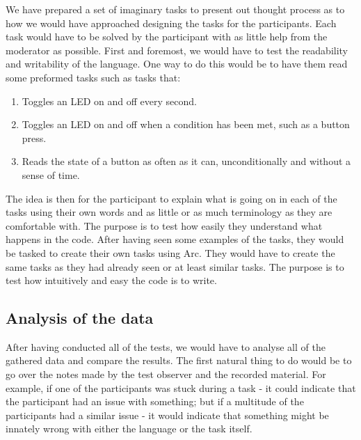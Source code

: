 We have prepared a set of imaginary tasks to present out thought process as to how we would have approached designing the tasks for the participants. Each task would have to be solved by the participant with as little help from the moderator as possible. First and foremost, we would have to test the readability and writability of the language. One way to do this would be to have them read some preformed tasks such as tasks that:

\begin{enumerate}
    \item Toggles an LED on and off every second.
    \item Toggles an LED on and off when a condition has been met, such as a button press.
    \item Reads the state of a button as often as it can, unconditionally and without a sense of time.
\end{enumerate}

The idea is then for the participant to explain what is going on in each of the tasks using their own words and as little or as much terminology as they are comfortable with. The purpose is to test how easily they understand what happens in the code. After having seen some examples of the tasks, they would be tasked to create their own tasks using Arc. They would have to create the same tasks as they had already seen or at least similar tasks. The purpose is to test how intuitively and easy the code is to write.

\subsection{Analysis of the data}\label{subsubsec:analysisOfTheData}

After having conducted all of the tests, we would have to analyse all of the gathered data and compare the results. The first natural thing to do would be to go over the notes made by the test observer and the recorded material. For example, if one of the participants was stuck during a task - it could indicate that the participant had an issue with something; but if a multitude of the participants had a similar issue - it would indicate that something might be innately wrong with either the language or the task itself.

